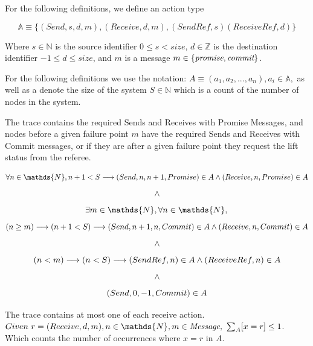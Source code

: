 \documentclass[runningheads]{llncs}
\newcommand{\action}{\mathds{A}}
\newcommand{\promise}{\emph{promise}}
\newcommand{\commit}{\emph{commit}}
\begin{document}
For the following definitions, we define an action type 
\begin{definition}
$$\action \equiv \{(Send, s, d, m), (Receive, d, m), (SendRef, s) (ReceiveRef, d)\}$$

Where $s \in \mathds{N}$ is the source identifier $0 \le s < size$, $d \in \mathds{Z}$ is the destination identifier $-1 \le d \le size$, and $m$ is a message $m \in \{\promise, \commit\}$.

\end{definition}
For the following definitions we use the notation: 
$A \equiv (a_1, a_2, ..., a_n), a_i \in \action,$ as well as a denote the size of the system $S \in \mathds{N}$ which is a count of the number of nodes in the system.

\begin{definition} The trace contains the required Sends and Receives with Promise Messages, and nodes before a given failure point $m$ have the required Sends and Receives with Commit messages, or if they are after a given failure point they request the lift status from the referee.

$$
   \forall n \in \mathds{N}, n + 1 < S \longrightarrow \\
   (Send, n, n+1, Promise) \in A \wedge (Receive, n, Promise) \in A\ \\
$$
$$ \wedge \\ $$
$$
   \exists m \in \mathds{N}, \forall n \in \mathds{N}, \\
$$
$$
   (n \ge m) \longrightarrow (n + 1 < S) \longrightarrow \\
   (Send, n+1, n, Commit) \in A \wedge (Receive, n, Commit) \in A\ \\
$$
$$ \wedge \\ $$
$$
   (n < m) \longrightarrow (n < S) \longrightarrow \\
   (SendRef, n) \in A \wedge (ReceiveRef, n) \in A\ \\
$$
$$ \wedge \\ $$
$$
    (Send, 0, -1, Commit) \in A \\
$$
\end{definition}

\begin{definition}
The trace contains at most one of each receive action. 
$Given\ r = (Receive, d, m), n \in \mathds{N}, m \in \emph{Message},\ \sloppy{\sum_{A}[x=r]} \le 1$. Which counts the number of occurrences where $x=r$ in $A$. 
\end{definition}
\end{document}
